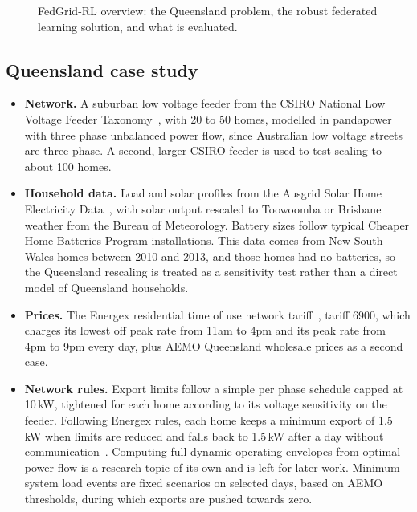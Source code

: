 \documentclass[11pt,a4paper]{article}
\begin{document}
\begin{figure}[ht]
{\begin{tikzpicture}
\end{tikzpicture}%
}
\caption{FedGrid-RL overview: the Queensland problem, the robust federated learning solution, and what is evaluated.}
\label{fig:pipeline}
\end{figure}

\subsection{Queensland case study}
\begin{itemize}
  \item \textbf{Network.} A suburban low voltage feeder from the CSIRO National Low Voltage Feeder Taxonomy~\cite{csiro_lv}, with 20 to 50 homes, modelled in pandapower with three phase unbalanced power flow, since Australian low voltage streets are three phase. A second, larger CSIRO feeder is used to test scaling to about 100 homes.
  \item \textbf{Household data.} Load and solar profiles from the Ausgrid Solar Home Electricity Data~\cite{ausgrid}, with solar output rescaled to Toowoomba or Brisbane weather from the Bureau of Meteorology. Battery sizes follow typical Cheaper Home Batteries Program installations. This data comes from New South Wales homes between 2010 and 2013, and those homes had no batteries, so the Queensland rescaling is treated as a sensitivity test rather than a direct model of Queensland households.
  \item \textbf{Prices.} The Energex residential time of use network tariff~\cite{energex_tariff}, tariff 6900, which charges its lowest off peak rate from 11am to 4pm and its peak rate from 4pm to 9pm every day, plus AEMO Queensland wholesale prices as a second case.
  \item \textbf{Network rules.} Export limits follow a simple per phase schedule capped at 10\,kW, tightened for each home according to its voltage sensitivity on the feeder. Following Energex rules, each home keeps a minimum export of 1.5\,kW when limits are reduced and falls back to 1.5\,kW after a day without communication~\cite{energex_doe}. Computing full dynamic operating envelopes from optimal power flow is a research topic of its own and is left for later work. Minimum system load events are fixed scenarios on selected days, based on AEMO thresholds, during which exports are pushed towards zero.
\end{itemize}
\end{document}
